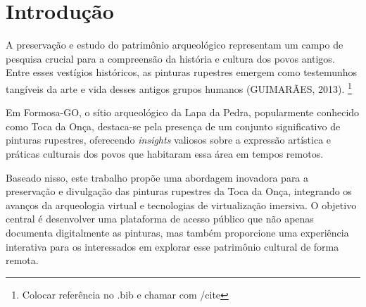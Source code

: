 \chapter{Introdução}\label{Introducao}

A preservação e estudo do patrimônio arqueológico representam um campo de pesquisa crucial para a compreensão da história e cultura dos povos antigos. Entre esses vestígios históricos, as pinturas rupestres emergem como testemunhos tangíveis da arte e vida desses antigos grupos humanos (GUIMARÃES, 2013). \footnote{Colocar referência no .bib e chamar com /cite}



Em Formosa-GO, o sítio arqueológico da Lapa da Pedra, popularmente conhecido como Toca da Onça, destaca-se pela presença de um conjunto significativo de pinturas rupestres, oferecendo \textit{insights} valiosos sobre a expressão artística e práticas culturais dos povos que habitaram essa área em tempos remotos.
    
Baseado nisso, este trabalho propõe uma abordagem inovadora para a preservação e divulgação das pinturas rupestres da Toca da Onça, integrando os avanços da arqueologia virtual e tecnologias de virtualização imersiva. O objetivo central é desenvolver uma plataforma de acesso público que não apenas documenta digitalmente as pinturas, mas também proporcione uma experiência interativa para os interessados em explorar esse patrimônio cultural de forma remota.

